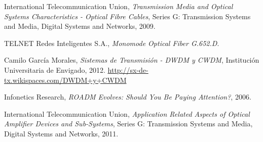 
\begin{thebibliography}{9}

  International Telecommunication Union,
  \emph{Transmission Media and Optical Systems Characteristics - Optical Fibre Cables},
  Series G: Transmission Systems and Media, Digital Systems and Networks,
  2009.

  TELNET Redes Inteligentes S.A.,
  \emph{Monomode Optical Fiber G.652.D}.
  
  Camilo Garc\'ia Morales,
  \emph{Sistemas de Transmisi\'on - DWDM y CWDM},
  Instituci\'on Universitaria de Envigado,
  2012.
  \url{http://sx-de-tx.wikispaces.com/DWDM+y+CWDM}
  
  Infonetics Research,
  \emph{ROADM Evolves: Should You Be Paying Attention?},
  2006.

  International Telecommunication Union,
  \emph{Application Related Aspects of Optical Amplifier Devices and Sub-Systems},
  Series G: Transmission Systems and Media, Digital Systems and Networks,
  2011.

\end{thebibliography}